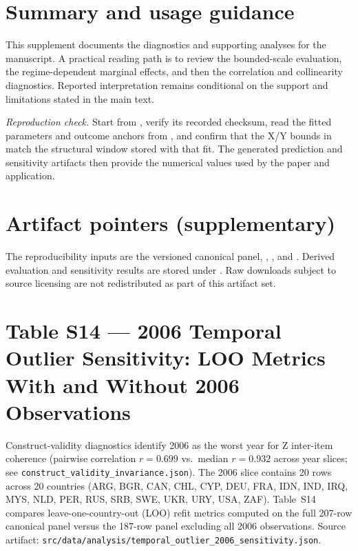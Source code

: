 \documentclass[11pt]{article}
\begin{document}
\section*{Summary and usage guidance}
This supplement documents the diagnostics and supporting analyses for the manuscript. A practical reading path is to review the bounded-scale evaluation, the regime-dependent marginal effects, and then the correlation and collinearity diagnostics. Reported interpretation remains conditional on the support and limitations stated in the main text.

\textit{Reproduction check.} Start from , verify its recorded checksum, read the fitted parameters and outcome anchors from , and confirm that the X/Y bounds in  match the structural window stored with that fit. The generated prediction and sensitivity artifacts then provide the numerical values used by the paper and application.

\section*{Artifact pointers (supplementary)}
The reproducibility inputs are the versioned canonical panel, , , and . Derived evaluation and sensitivity results are stored under . Raw downloads subject to source licensing are not redistributed as part of this artifact set.

\section*{Table S14 --- 2006 Temporal Outlier Sensitivity: LOO Metrics With and Without 2006 Observations}

\noindent\justifying
Construct-validity diagnostics identify 2006 as the worst year for Z inter-item coherence (pairwise correlation $r = 0.699$ vs.\ median $r = 0.932$ across year slices; see \texttt{construct\_validity\_invariance.json}). The 2006 slice contains 20 rows across 20 countries (ARG, BGR, CAN, CHL, CYP, DEU, FRA, IDN, IND, IRQ, MYS, NLD, PER, RUS, SRB, SWE, UKR, URY, USA, ZAF). Table~S14 compares leave-one-country-out (LOO) refit metrics computed on the full 207-row canonical panel versus the 187-row panel excluding all 2006 observations. Source artifact: \nolinkurl{src/data/analysis/temporal_outlier_2006_sensitivity.json}.
\end{document}
